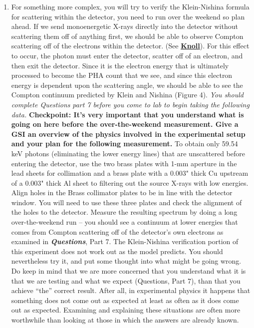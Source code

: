 \documentclass{../lab}
\begin{document}
\begin{enumerate}
    \item For something more complex, you will try to verify the Klein-Nishina formula for scattering within the detector, you need to run over the weekend so plan ahead. If we send monoenergetic X-rays directly into the detector without scattering them off of anything first, we should be able to observe Compton scattering off of the electrons within the detector. (See \href{http://physics111.lib.berkeley.edu/Physics111/Reprints/COM/COM\_index.html}{\textbf{Knoll}}). For this effect to occur, the photon must enter the detector, scatter off of an electron, and then exit the detector. Since it is the electron energy that is ultimately processed to become the PHA count that we see, and since this electron energy is dependent upon the scattering angle, we should be able to see the Compton continuum predicted by Klein and Nishina (Figure 4). \emph{You should complete Questions} \emph{part 7 before you come to lab to begin taking the following data.} \textbf{Checkpoint: It's very important that you understand what is going on here before the over-the-weekend measurement. Give a GSI an overview of the physics involved in the experimental setup and your plan for the following measurement.} To obtain only 59.54 keV photons (eliminating the lower energy lines) that are unscattered before entering the detector, use the two brass plates with 1-mm aperture in the lead sheets for collimation and a brass plate with a 0.003" thick Cu upstream of a 0.003" thick Al sheet to filtering out the source X-rays with low energies. Align holes in the Brass collimator plates to be in line with the detector window. You will need to use these three plates and check the alignment of the holes to the detector. Measure the resulting spectrum by doing a long over-the-weekend run -- you should see a continuum at lower energies that comes from Compton scattering off of the detector's own electrons as examined in \emph{\textbf{Questions}}, Part 7. The Klein-Nishina verification portion of this experiment does not work out as the model predicts. You should nevertheless try it, and put some thought into what might be going wrong. Do keep in mind that we are more concerned that you understand what it is that we are testing and what we expect (Questions, Part 7), than that you achieve ``the'' correct result. After all, in experimental physics it happens that something does not come out as expected at least as often as it does come out as expected. Examining and explaining these situations are often more worthwhile than looking at those in which the answers are already known.


\end{enumerate}
\end{document}
